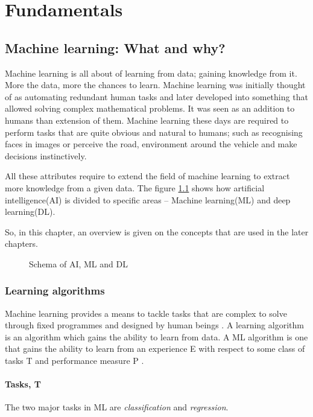 \chapter{Fundamentals}
\section{Machine learning: What and why?}
Machine learning is all about of learning from data; gaining knowledge from it. More the
data, more the chances to learn. Machine learning was initially thought of as automating
redundant human tasks and later developed into something that allowed solving complex
mathematical problems. It was seen as an addition to humans than extension of them.
Machine learning these days are required to perform tasks that are quite obvious and
natural to humans; such as recognising faces in images or perceive the road, environment
around the vehicle and make decisions instinctively.

All these attributes require to extend the field of machine learning to extract more
knowledge from a given data. The figure \ref{fig:ai_ml_dl} shows how artificial
intelligence(AI) is divided to specific areas -- Machine learning(ML) and deep learning(DL).

So, in this chapter, an overview is given on the concepts that are used in the later chapters.

\begin{figure}[h]
	\centering
    \def\svgwidth{0.5\textwidth}
    \caption{Schema of AI, ML and DL}
    \label{fig:ai_ml_dl}
\end{figure}

\subsection{Learning algorithms}
Machine learning provides a means to tackle tasks that are complex to solve through fixed
programmes and designed by human beings \cite{Goodfellow-et-al-2016}. A learning algorithm
is an algorithm which gains the ability to learn from data. A ML algorithm is one that
gains the ability to learn from an experience E with respect to some class of tasks T and
performance measure P \cite{mitchell1996m}.

\subsubsection*{Tasks, T}
The two major tasks in ML are \textit{classification} and \textit{regression}.

